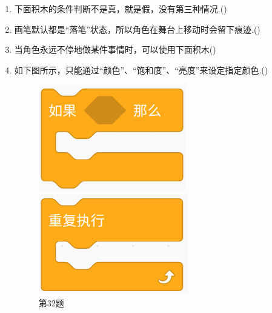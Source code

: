 \documentclass[10pt, a4paper]{article}
\begin{document}
\begin{enumerate}
        \item 下面积木的条件判断不是真，就是假，没有第三种情况.(\qquad)
        
        \item 画笔默认都是“落笔”状态，所以角色在舞台上移动时会留下痕迹.(\qquad)
        
        \item 当角色永远不停地做某件事情时，可以使用下面积木(\qquad)
        
        \item 如下图所示，只能通过“颜色”、“饱和度”、“亮度”来设定指定颜色.(\qquad)  
        \begin{figure}[htbp]
            \centering
            \begin{minipage}[t]{.16\textwidth}
                \centering
                \includegraphics[width=\textwidth]{32.png}
                \caption*{第32题}
            \end{minipage}
            \begin{minipage}[t]{.18\textwidth}
                \centering
                \includegraphics[width=\textwidth]{34.png}

\end{minipage}
\end{figure}
\end{enumerate}
\end{document}

